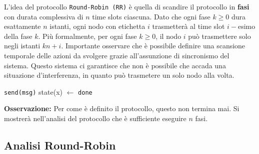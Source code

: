 L'idea del protocollo \texttt{Round-Robin (RR)} è quella di scandire il protocollo in \textbf{fasi} con durata complessiva di $n$ time slots ciascuna. Dato che ogni fase $k \geq 0$ dura esattamente $n$ istanti, ogni nodo con etichetta $i$ trasmetterà al time slot $i-$esimo della fase $k$. Più formalmente, per ogni fase $k \geq 0$, il nodo $i$ può trasmettere solo negli istanti $kn + i$. Importante osservare che è possibile definire una scansione temporale delle azioni da svolgere grazie all'assunzione di sincronismo del sistema. Questo sistema ci garantisce che non è possibile che accada una situazione d'interferenza, in quanto può trasmetere un solo nodo alla volta.

\begin{algorithm}
\caption{Round-Robin Protocol}
\begin{algorithmic}[1]
            \State \texttt{send(msg)}
            \State state(x) $\gets$ \texttt{done}
        \EndIf
    \EndFor
\EndFor
\end{algorithmic}
\end{algorithm}

\textbf{Osservazione:} Per come è definito il protocollo, questo non termina mai. Si mostrerà nell'analisi del protocollo che è sufficiente eseguire $n$ fasi.

\subsection{Analisi Round-Robin}

